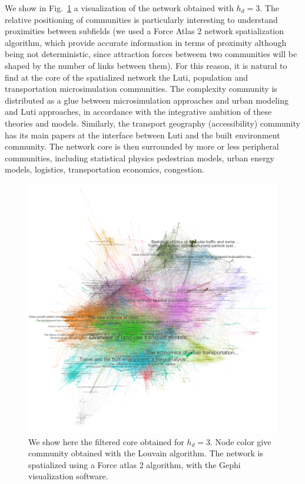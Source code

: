 We show in Fig.~\ref{fig:networkviz} a visualization of the network obtained with $h_d=3$. The relative positioning of communities is particularly interesting to understand proximities between subfields (we used a Force Atlas 2 network spatialization algorithm, which provide accurate information in terms of proximity although being not deterministic, since attraction forces betweem two communities will be shaped by the number of links between them). For this reason, it is natural to find at the core of the spatialized network the Luti, population and transportation microsimulation communities. 
The complexity community is distributed as a glue between microsimulation approaches and urban modeling and Luti approaches, in accordance with the integrative ambition of these theories and models. Similarly, the transport geography (accessibility) community has its main papers at the interface between Luti and the built environment community. The network core is then surrounded by more or less peripheral communities, including statistical physics pedestrian models, urban energy models, logistics, transportation economics, congestion.


\begin{figure}
    \centering
    \includegraphics[width=\linewidth]{figures/corehdepth3filteredLOWRES.png}
    \caption{ We show here the filtered core obtained for $h_d = 3$. Node color give community obtained with the Louvain algorithm. The network is spatialized using a Force atlas 2 algorithm, with the Gephi visualization software.}
    \label{fig:networkviz}
\end{figure}


